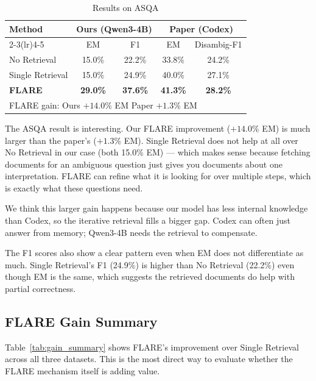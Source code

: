 \documentclass[conference]{IEEEtran}
\begin{document}
\begin{table}[htbp]
\caption{Results on ASQA}
\label{tab:asqa}
\centering
\begin{tabular}{lcccc}
\toprule
\multirow{2}{*}{\textbf{Method}} &
  \multicolumn{2}{c}{\textbf{Ours (Qwen3-4B)}} &
  \multicolumn{2}{c}{\textbf{Paper (Codex)}} \\
\cmidrule(lr){2-3}\cmidrule(lr){4-5}
& EM & F1 & EM & Disambig-F1 \\
\midrule
No Retrieval     & 15.0\% & 22.2\% & 33.8\% & 24.2\% \\
Single Retrieval & 15.0\% & 24.9\% & 40.0\% & 27.1\% \\
\textbf{FLARE}   & \textbf{29.0\%} & \textbf{37.6\%}
                 & \textbf{41.3\%} & \textbf{28.2\%} \\
\midrule
\multicolumn{5}{l}{\small FLARE gain: Ours $+14.0\%$ EM \quad Paper $+1.3\%$ EM} \\
\bottomrule
\end{tabular}
\end{table}

The ASQA result is interesting. Our FLARE improvement ($+14.0\%$ EM)
is much larger than the paper's ($+1.3\%$ EM). Single Retrieval
does not help at all over No Retrieval in our case (both 15.0\% EM)
— which makes sense because fetching documents for an ambiguous
question just gives you documents about one interpretation. FLARE
can refine what it is looking for over multiple steps, which is
exactly what these questions need.

We think this larger gain happens because our model has less
internal knowledge than Codex, so the iterative retrieval fills a
bigger gap. Codex can often just answer from memory; Qwen3-4B needs
the retrieval to compensate.

The F1 scores also show a clear pattern even when EM does not
differentiate as much. Single Retrieval's F1 (24.9\%) is higher
than No Retrieval (22.2\%) even though EM is the same, which
suggests the retrieved documents do help with partial correctness.

\subsection{FLARE Gain Summary}

Table~\ref{tab:gain_summary} shows FLARE's improvement over Single
Retrieval across all three datasets. This is the most direct way
to evaluate whether the FLARE mechanism itself is adding value.
\end{document}

